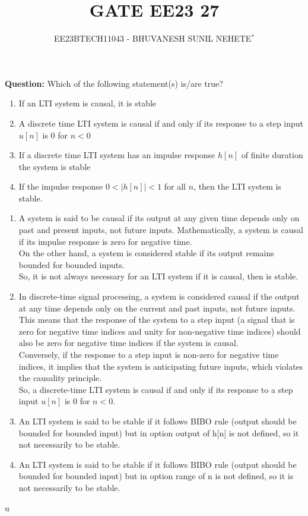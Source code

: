 \documentclass[journal,12pt,twocolumn]{IEEEtran}
\theoremstyle{remark}
\begin{document}

\vspace{3cm}

\title{GATE EE23 27}
\author{EE23BTECH11043 - BHUVANESH SUNIL NEHETE$^{*}$%
}
\maketitle
\newpage
\bigskip

\renewcommand{\thefigure}{\theenumi}
\renewcommand{\thetable}{\theenumi}



\textbf{Question:}
Which of the following statement(s) is/are true?
\begin{enumerate}[label=\alph*)]
    \item If an LTI system is causal, it is stable
    \item A discrete time LTI system is causal if and only if its response to a step input $u[n]$ is 0 for $n < 0$
    \item If a discrete time LTI system has an impulse response $h[n]$ of finite duration the system is stable
    \item If the impulse response $0<|h[n]|<1$ for all $n$, then the LTI system is stable.
\end{enumerate}

\solution
\begin{enumerate}
    \item A system is said to be causal if its output at any given time depends only on past and present inputs, not future inputs. Mathematically, a system is causal if its impulse response is zero for negative time.\\
    On the other hand, a system is considered stable if its output remains bounded for bounded inputs.\\
    So, it is not always necessary for an LTI system if it is causal, then is stable.
    \item In discrete-time signal processing, a system is considered causal if the output at any time depends only on the current and past inputs, not future inputs. This means that the response of the system to a step input (a signal that is zero for negative time indices and unity for non-negative time indices) should also be zero for negative time indices if the system is causal.\\
    Conversely, if the response to a step input is non-zero for negative time indices, it implies that the system is anticipating future inputs, which violates the causality principle.\\
    So, a discrete-time LTI system is causal if and only if its response to a step input $u[n]$ is 0 for $n<0$.
    \item An LTI system is said to be stable if it follows BIBO rule (output should be bounded for bounded input) but in option  output of h[n] is not defined, so it not necessarily to be stable.
    \item An LTI system is said to be stable if it follows BIBO rule (output should be bounded for bounded input) but in option  range of n is not defined, so it is not necessarily to be stable.
\end{enumerate}

u
\end{document}
